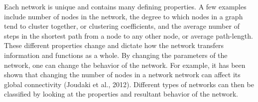 \documentclass[11pt,letterpaper,doublespacing,titlepage]{article}
\begin{document}

\par
Each network is unique and contains many defining properties. A few examples include number of nodes in the network, the degree to which nodes in a graph tend to cluster together, or  clustering coefficients, and the average number of steps in the shortest path from a node to any other node, or average path-length. These different properties change and dictate how the network transfers information and functions as a whole. By changing the parameters of the network, one can change the behavior of the network. For example, it has been shown that changing the number of nodes in a network network can affect its global connectivity (Joudaki et al., 2012). Different types of networks can then be classified by looking at the properties and resultant behavior of the network.
\end{document}
